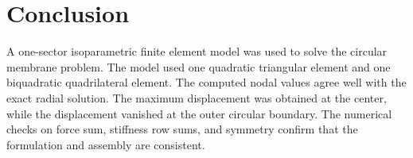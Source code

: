 \documentclass[12pt,a4paper]{article}
\begin{document}
\section{Conclusion}

A one-sector isoparametric finite element model was used to solve the circular membrane problem. The model used one quadratic triangular element and one biquadratic quadrilateral element. The computed nodal values agree well with the exact radial solution. The maximum displacement was obtained at the center, while the displacement vanished at the outer circular boundary. The numerical checks on force sum, stiffness row sums, and symmetry confirm that the formulation and assembly are consistent.
\end{document}
